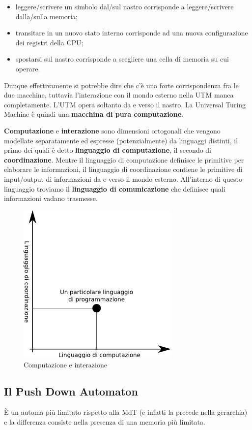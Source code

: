 \documentclass[11pt]{book}
\begin{document}
\begin{itemize}
\item leggere/scrivere un simbolo dal/sul nastro corrisponde a
  leggere/scrivere dalla/sulla memoria;
\item transitare in un nuovo stato interno corrisponde ad una nuova
  configurazione dei registri della CPU;
\item spostarsi sul nastro corrisponde a scegliere una cella di
  memoria su cui operare.
\end{itemize}

Dunque effettivamente si potrebbe dire che c'\`e una forte
corrispondenza fra le due macchine, tuttavia l'interazione con il
mondo esterno nella UTM manca completamente. L'UTM opera soltanto da e
verso il nastro. La Universal Turing Machine \`e quindi una
\textbf{macchina di pura computazione}.

\textbf{Computazione} e \textbf{interazione} sono dimensioni
ortogonali che vengono modellate separatamente ed espresse
(potenzialmente) da linguaggi distinti, il primo dei quali \`e detto
\textbf{linguaggio di computazione}, il secondo di
\textbf{coordinazione}. Mentre il linguaggio di computazione definisce
le primitive per elaborare le informazioni, il linguaggio di
coordinazione contiene le primitive di input/output di informazioni da
e verso il mondo esterno. All'interno di questo linguaggio troviamo il
\textbf{linguaggio di comunicazione} che definisce quali informazioni
vadano trasmesse.

\begin{figure}[h]
  \centering
  \includegraphics[width=.35\textwidth]{images/computazioneinterazione.png}
  \caption{Computazione e interazione}
  \label{computazioneinterazione}
\end{figure}


\subsection{Il Push Down Automaton}

\`E un automa pi\`u limitato rispetto alla MdT (e infatti la precede
nella gerarchia) e la differenza consiste nella presenza di una
memoria pi\`u limitata.
\end{document}
